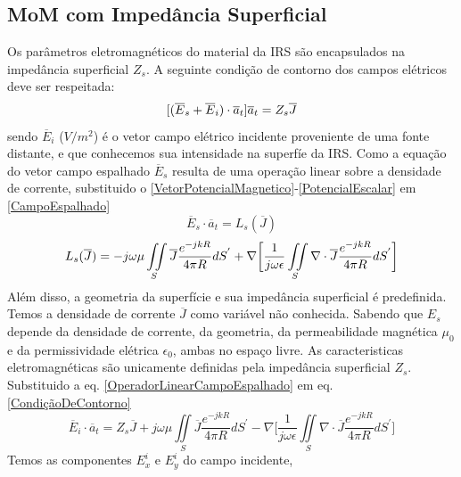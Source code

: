 \documentclass[
	12pt,				%
	openright,			%
	oneside,			%
	a4papey79r,			%
	english,			%
	brazil				%
	]{abntex2}
\begin{document}
\subsection{MoM com Impedância Superficial}

Os parâmetros eletromagnéticos do material da IRS são encapsulados na impedância superficial $Z_s$. A seguinte condição de contorno dos campos elétricos deve ser respeitada:
  \begin{equation}{\label{CondiçãoDeContorno}}
    [(\overline{E}_s+\overline{E}_{i})\cdot \overline{a}_t]\overline{a}_t=Z_s\overline{J}
  \end{equation}
sendo $\overline{E}_i$ ($V/m^2$) é o vetor campo elétrico incidente proveniente de uma fonte distante, e que conhecemos sua intensidade na superfíe da IRS. Como a equação do vetor campo espalhado $\overline{E}_s$ resulta de uma operação linear  sobre a densidade de corrente, substituido o \ref{VetorPotencialMagnetico}-\ref{PotencialEscalar} em \ref{CampoEspalhado}
\begin{equation}
    \overline{E}_s \cdot \overline{a}_t=L_s(\overline{J})
\end{equation}
  \begin{equation}{\label{OperadorLinearCampoEspalhado}}
      L_s(\overline{J})= -j\omega \mu \iint\limits_S\overline{J} \frac{e^{-j k R}}{4 \pi R} dS^{'} +
    \nabla \biggl[ \frac{1}{j\omega \epsilon}\iint\limits_S \nabla \cdot \overline{J}\frac{e^{-j k R}}{4 \pi R} dS^{'}  \biggl] 
  \end{equation}
Além disso, a geometria da superfície e sua impedância superficial é predefinida. Temos a densidade de corrente $\overline{J}$ como variável não conhecida. Sabendo que $E_s$ depende da densidade de corrente, da geometria,  da permeabilidade magnética  $\mu_0$ e da permissividade elétrica $\epsilon_0$, ambas no espaço livre. As caracteristicas eletromagnéticas são unicamente definidas pela impedância superficial $Z_s$. Substituido a eq. \ref{OperadorLinearCampoEspalhado} em eq. \ref{CondiçãoDeContorno}
\begin{equation}
\overline{E}_{i}\cdot \overline{a}_t=Z_s\overline{J}+j\omega \mu \iint\limits_S\overline{J} \frac{e^{-j k R}}{4 \pi R} dS^{'} -
    \nabla \biggl[ \frac{1}{j\omega \epsilon}\iint\limits_S \nabla \cdot \overline{J}\frac{e^{-j k R}}{4 \pi R} dS^{'}  \biggl] 
\end{equation}
Temos as componentes $E_x^{i}$ e $E_y^{i}$ do campo incidente,
\end{document}
